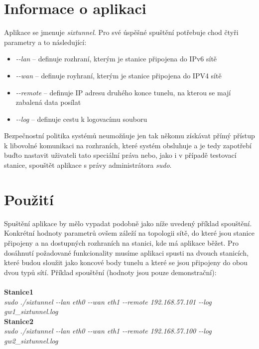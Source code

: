 \documentclass[12pt,a4paper,onecolumn]{article}
\begin{document}
\section{Informace o aplikaci}
Aplikace se jmenuje \textit{sixtunnel}. Pro své úspěšné spuštění potřebuje chod čtyři parametry a
to následující:
\begin{itemize}
    \item \textit{\--\--lan} -- definuje rozhraní, kterým je stanice připojena do IPv6 sítě
    \item \textit{\--\--wan} -- definuje royhraní, kterým je stanice připojena do IPV4 sítě
    \item \textit{\--\--remote} -- definuje IP adresu druhého konce tunelu, na kterou se mají
        zabalená data posílat
    \item \textit{\--\--log} -- definuje cestu k logovacímu souboru
\end{itemize}
\indent Bezpečnostní politika systémů neumožňuje jen tak někomu získávat přímý přístup k libovolné
komunikaci na rozhraních, které systém obsluhuje a je tedy zapotřebí buďto nastavit uživateli tato
speciální práva nebo, jako i v případě testovací stanice, spouštět aplikace s právy administrátora
\textit{sudo}.

\section{Použití}
Spuštění aplikace by mělo vypadat podobně jako níže uvedený příklad spouštění. Konkrétní hodnoty
parametrů ovšem záleží na topologii sítě, do které jsou stanice připojeny a na dostupných
rozhraních na stanici, kde má aplikace běžet.
\indent Pro dosáhnutí požadované funkcionality musíme aplikaci spusti na dvouch stanicích,
které budou sloužit jako koncové body tunelu a které se jsou připojeny do obou dvou typů
sítí. Příklad spouštění (hodnoty jsou pouze demonstrační):\\ \\
\textbf{Stanice1} \\
\textit{sudo ./sixtunnel \--\--lan eth0 \--\--wan eth1 \--\--remote 192.168.57.101 \--\--log gw1\_sixtunnel.log}\\
\textbf{Stanice2} \\
\textit{sudo ./sixtunnel \--\--lan eth0 \--\--wan eth1 \--\--remote 192.168.57.100 \--\--log gw2\_sixtunnel.log}
\end{document}
